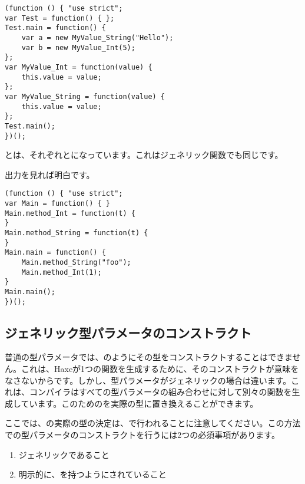 \begin{lstlisting}
(function () { "use strict";
var Test = function() { };
Test.main = function() {
	var a = new MyValue_String("Hello");
	var b = new MyValue_Int(5);
};
var MyValue_Int = function(value) {
	this.value = value;
};
var MyValue_String = function(value) {
	this.value = value;
};
Test.main();
})();
\end{lstlisting}

とは、それぞれとになっています。これはジェネリック関数でも同じです。


出力を見れば明白です。

\begin{lstlisting}
(function () { "use strict";
var Main = function() { }
Main.method_Int = function(t) {
}
Main.method_String = function(t) {
}
Main.main = function() {
	Main.method_String("foo");
	Main.method_Int(1);
}
Main.main();
})();
\end{lstlisting}


\subsection{ジェネリック型パラメータのコンストラクト}
\label{type-system-generic-type-parameter-construction}


普通の型パラメータでは、のようにその型をコンストラクトすることはできません。これは、Haxeが1つの関数を生成するために、そのコンストラクトが意味をなさないからです。しかし、型パラメータがジェネリックの場合は違います。これは、コンパイラはすべての型パラメータの組み合わせに対して別々の関数を生成しています。このためのを実際の型に置き換えることができます。


ここでは、の実際の型の決定は、で行われることに注意してください。この方法での型パラメータのコンストラクトを行うには2つの必須事項があります。

\begin{enumerate}
	\item ジェネリックであること
	\item 明示的に、を持つようにされていること
\end{enumerate}


